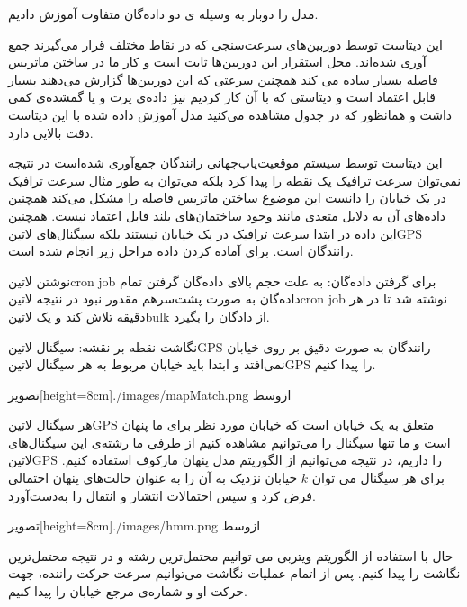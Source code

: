 مدل را دوبار به وسیله ی دو داده‌گان متفاوت آموزش دادیم.

این دیتاست توسط دوربین‌های سرعت‌سنجی که در نقاط مختلف قرار می‌گیرند جمع آوری شده‌اند. محل استقرار این دوربین‌ها ثابت است و کار ما در ساختن ماتریس فاصله بسیار ساده می کند همچنین سرعتی که این دوربین‌ها گزارش می‌دهند بسیار قابل اعتماد است و دیتاستی که با آن کار کردیم نیز داده‌ی پرت و یا گمشده‌ی کمی داشت و همانظور که در جدول  مشاهده می‌کنید مدل آموزش داده شده با این دیتاست دقت بالایی دارد.


این دیتاست توسط سیستم موقعیت‌‌یاب‌جهانی رانندگان جمع‌آوری شده‌است در نتیجه نمی‌توان سرعت ترافیک یک نقطه را پیدا کرد بلکه می‌توان
به طور مثال سرعت ترافیک در یک خیابان را دانست این موضوع ساختن ماتریس فاصله را مشکل می‌کند همچنین داده‌های آن به دلایل متعدی مانند
وجود ساختمان‌های بلند قابل اعتماد نیست. همچنین این داده در ابتدا سرعت ترافیک در یک خیابان نیستند بلکه سیگنال‌های ‌لاتین{GPS} رانندگان است. برای آماده کردن داده مراحل زیر انجام شده است.


 نوشتن ‌لاتین{cron job} برای گرفتن داده‌گان: به علت حجم بالای داده‌گان گرفتن تمام داده‌گان به صورت پشت‌سر‌هم مقدور نبود
در نتیجه ‌لاتین{cron job} نوشته شد تا در هر دقیقه تلاش کند و یک ‌لاتین{bulk} از دادگان را بگیرد.

 نگاشت نقطه بر نقشه: سیگنال ‌لاتین{GPS} رانندگان به صورت دقیق بر روی خیابان نمی‌افتد و ابتدا باید خیابان مربوط به هر سیگنال ‌لاتین{‌GPS} را پیدا کنیم.

  ‌تصویر[height=8cm]{./images/mapMatch.png}
  ‌ازوسط

هر سیگنال ‌لاتین{GPS} متعلق به یک خیابان است که خیابان مورد نظر برای ما پنهان است و ما تنها سیگنال را می‌توانیم مشاهده کنیم
از طرفی ما رشته‌ی این سیگنال‌های ‌لاتین{GPS} را داریم، در نتیجه می‌توانیم از الگوریتم مدل پنهان مارکوف  استفاده کنیم.
برای هر سیگنال می توان $k$ خیابان نزدیک به آن را به عنوان حالت‌های پنهان احتمالی فرض کرد و سپس احتمالات انتشار و انتقال را به‌دست‌آورد.

  ‌تصویر[height=8cm]{./images/hmm.png}
  ‌ازوسط

حال با استفاده از الگوریتم ویتربی می توانیم محتمل‌ترین رشته و در نتیجه محتمل‌ترین نگاشت را پیدا کنیم.
پس از اتمام عملیات نگاشت می‌توانیم سرعت حرکت راننده، جهت حرکت او و شماره‌ی مرجع خیابان  را پیدا کنیم.

